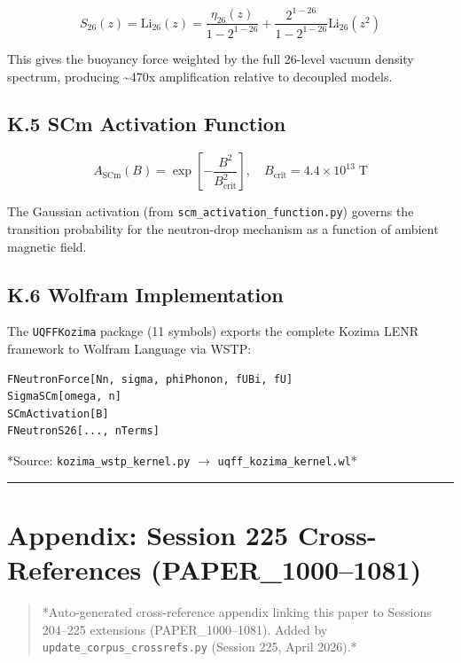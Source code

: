 \documentclass[11pt]{article}
\begin{document}
$$S_{26}(z) = \text{Li}_{26}(z) = \frac{\eta_{26}(z)}{1 - 2^{1-26}} + \frac{2^{1-26}}{1 - 2^{1-26}} \text{Li}_{26}(z^2)$$

This gives the buoyancy force weighted by the full 26-level vacuum density spectrum, producing \textasciitilde{}470x amplification relative to decoupled models.

\subsection*{K.5 SCm Activation Function}

$$A_{\mathrm{SCm}}(B) = \exp\!\left[-\frac{B^2}{B_{\mathrm{crit}}^2}\right], \quad B_{\mathrm{crit}} = 4.4 \times 10^{13} \;\text{T}$$

The Gaussian activation (from \verb|scm_activation_function.py|) governs the transition probability for the neutron-drop mechanism as a function of ambient magnetic field.

\subsection*{K.6 Wolfram Implementation}

The \verb|UQFFKozima| package (11 symbols) exports the complete Kozima LENR framework to Wolfram Language via WSTP:

\begin{verbatim}
FNeutronForce[Nn, sigma, phiPhonon, fUBi, fU]
SigmaSCm[omega, n]
SCmActivation[B]
FNeutronS26[..., nTerms]
\end{verbatim}

*Source: \verb|kozima_wstp_kernel.py| $\to$ \verb|uqff_kozima_kernel.wl|*

\noindent\rule{\textwidth}{0.4pt}

\section*{Appendix: Session 225 Cross-References (PAPER\_1000--1081)}

\begin{quote}
*Auto-generated cross-reference appendix linking this paper to
Sessions 204--225 extensions (PAPER\_1000--1081). Added by
\verb|update_corpus_crossrefs.py| (Session 225, April 2026).*
\end{quote}
\end{document}
